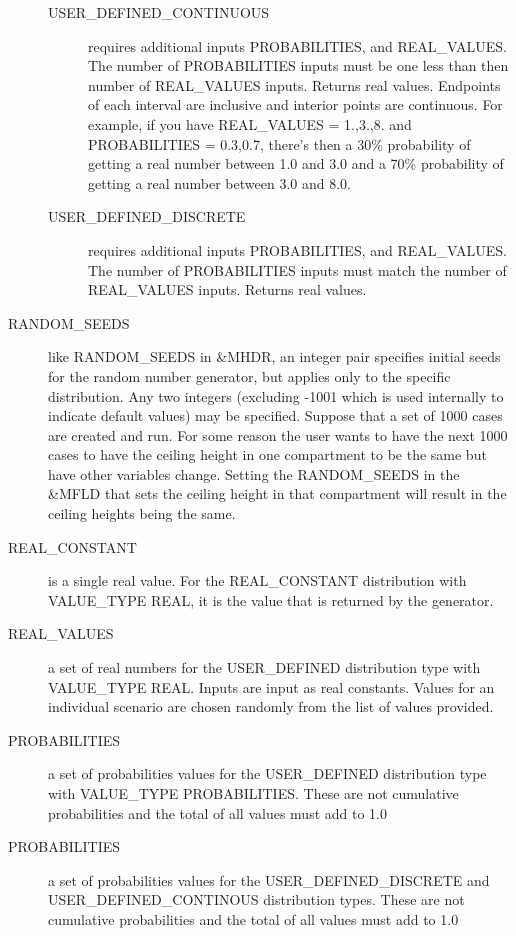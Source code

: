\documentclass[12pt,twoside]{book}
\begin{document}
\begin{description}
\begin{description}
        \item[USER\_DEFINED\_CONTINUOUS] requires additional inputs {\ct PROBABILITIES}, and {\ct REAL\_VALUES}. The number of {\ct PROBABILITIES} inputs must be one less than then number of {\ct REAL\_VALUES} inputs. Returns real values. Endpoints of each interval are inclusive and interior points are continuous. For example, if you have {\ct REAL\_VALUES} = 1.,3.,8. and {\ct PROBABILITIES} = 0.3,0.7, there’s then a 30\% probability of getting a real number between 1.0 and 3.0 and a 70\% probability of getting a real number between 3.0 and 8.0.
        \item[USER\_DEFINED\_DISCRETE] requires additional inputs {\ct PROBABILITIES}, and {\ct REAL\_VALUES}. The number of {\ct PROBABILITIES} inputs must match the number of {\ct REAL\_VALUES} inputs. Returns real values.
      \end{description}
  \item[RANDOM\_SEEDS]like {\ct RANDOM\_SEEDS} in {\ct \&MHDR}, an integer pair specifies initial seeds for the random number generator, but applies only to the specific distribution. Any two integers (excluding -1001 which is used internally to indicate default values) may be specified. Suppose that a set of 1000 cases are created and run. For some reason the user wants to have the next 1000 cases to have the ceiling height in one compartment to be the same but have other variables change. Setting the {\ct RANDOM\_SEEDS} in the {\ct \&MFLD} that sets the ceiling height in that compartment will result in the ceiling heights being the same. 
  \item[REAL\_CONSTANT] is a single real value. For the {\ct REAL\_CONSTANT} distribution with {\ct VALUE\_TYPE} {\ct REAL}, it is the value that is returned by the generator.
  \item[REAL\_VALUES] a set of real numbers for the {\ct USER\_DEFINED} distribution type with {\ct VALUE\_TYPE} {\ct REAL}. Inputs are input as real constants. Values for an individual scenario are chosen randomly from the list of values provided.
  \item[PROBABILITIES] a set of probabilities values for the {\ct USER\_DEFINED} distribution type with {\ct VALUE\_TYPE} {\ct PROBABILITIES}. These are not cumulative probabilities and the total of all values must add to 1.0
  \item[PROBABILITIES] a set of probabilities values for the {\ct USER\_DEFINED\_DISCRETE} and \\
 { \ct USER\_DEFINED\_CONTINOUS} distribution types. These are not cumulative probabilities and the total of all values must add to 1.0

\end{description}
\end{document}
